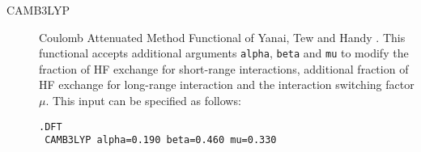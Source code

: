 \begin{description}
\begin{description}





\item[CAMB3LYP] Coulomb Attenuated Method Functional of Yanai, Tew and
Handy \cite{dft:camb3lyp}. This functional accepts additional arguments
\verb|alpha|, \verb|beta| and \verb|mu| to modify the fraction of HF
exchange for short-range interactions, additional fraction of HF
exchange for long-range interaction and the interaction switching
factor $\mu$. This input can be specified as follows:
\begin{verbatim}
.DFT
 CAMB3LYP alpha=0.190 beta=0.460 mu=0.330
\end{verbatim}





\end{description}
\end{description}
